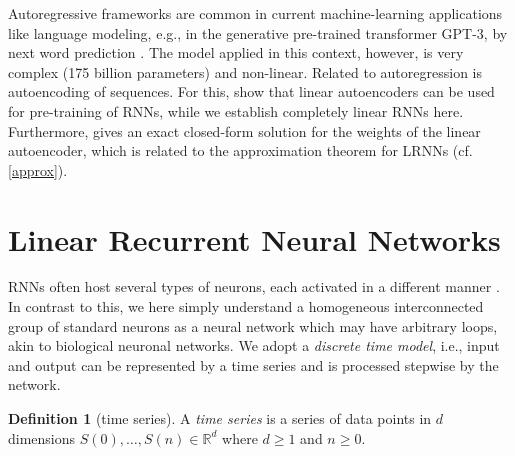 \documentclass[twoside,11pt]{article}
\theoremstyle{definition}
\newtheorem{defn}{Definition}
\begin{document}
Autoregressive frameworks are common in current machine-learning applications
like language modeling, e.g., in the generative pre-trained transformer GPT-3,
by next word prediction \citep{BM+20}. The model applied in this context,
however, is very complex (175 billion parameters) and non-linear.
Related to autoregression is autoencoding of sequences. For this, \citet{PS14}
show that linear autoencoders can be used for pre-training of RNNs, while we
establish completely linear RNNs here. Furthermore, \citet{Spe06} gives an
exact closed-form solution for the weights of the linear autoencoder, which is
related to the approximation theorem for LRNNs (cf. \cref{approx}).


\section{Linear Recurrent Neural Networks}\label{define}

RNNs often host several types of neurons, each activated in a different manner
\citep{Elm90,HS97}. In contrast to this, we here simply understand a homogeneous
interconnected group of standard neurons as a neural network which may have
arbitrary loops, akin to biological neuronal networks. We adopt a \emph{discrete
time model}, i.e., input and output can be represented by a time series and is
processed stepwise by the network.

\begin{defn}[time series]
A \emph{time series} is a series of data points in $d$ dimensions
$S(0),\dots,S(n) \in \mathbb{R}^d$ where $d \ge 1$ and $n \ge 0$.
\end{defn}
\end{document}
